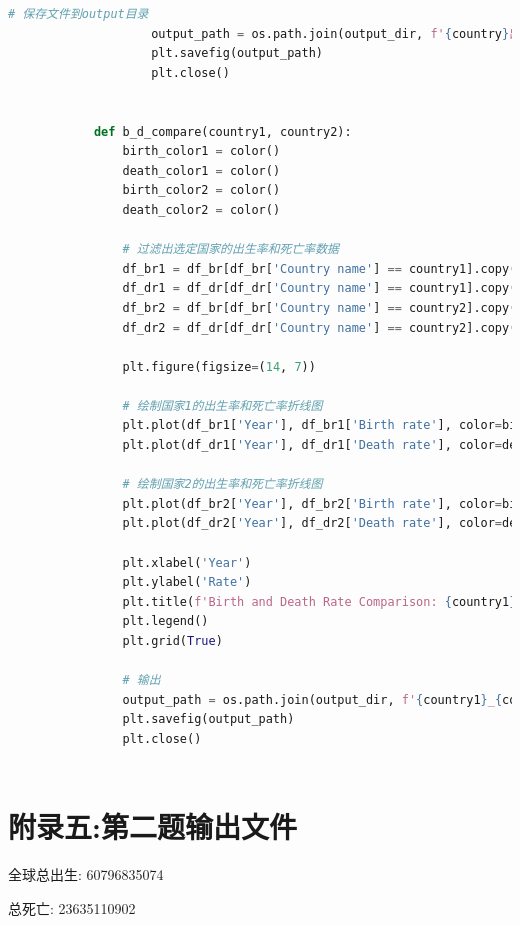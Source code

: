\documentclass{ctexart}
\begin{document}
\begin{lstlisting}[language=Python]
                    # 保存文件到output目录
                    output_path = os.path.join(output_dir, f'{country}出生死亡人数折线图.png')
                    plt.savefig(output_path)
                    plt.close()


            def b_d_compare(country1, country2):
                birth_color1 = color()
                death_color1 = color()
                birth_color2 = color()
                death_color2 = color()

                # 过滤出选定国家的出生率和死亡率数据
                df_br1 = df_br[df_br['Country name'] == country1].copy()
                df_dr1 = df_dr[df_dr['Country name'] == country1].copy()
                df_br2 = df_br[df_br['Country name'] == country2].copy()
                df_dr2 = df_dr[df_dr['Country name'] == country2].copy()

                plt.figure(figsize=(14, 7))

                # 绘制国家1的出生率和死亡率折线图
                plt.plot(df_br1['Year'], df_br1['Birth rate'], color=birth_color1, marker='o', linestyle='-', label=f'{country1} Birth Rate')
                plt.plot(df_dr1['Year'], df_dr1['Death rate'], color=death_color1, marker='x', linestyle='--', label=f'{country1} Death Rate')

                # 绘制国家2的出生率和死亡率折线图
                plt.plot(df_br2['Year'], df_br2['Birth rate'], color=birth_color2, marker='o', linestyle='-', label=f'{country2} Birth Rate')
                plt.plot(df_dr2['Year'], df_dr2['Death rate'], color=death_color2, marker='x', linestyle='--', label=f'{country2} Death Rate')

                plt.xlabel('Year')
                plt.ylabel('Rate')
                plt.title(f'Birth and Death Rate Comparison: {country1} vs {country2}')
                plt.legend()
                plt.grid(True)

                # 输出
                output_path = os.path.join(output_dir, f'{country1}_{country2}比较.png')
                plt.savefig(output_path)
                plt.close()
    
        \end{lstlisting}
    \newpage

    \section{附录五:第二题输出文件}

    \tiny
    全球总出生: 60796835074 \par
    总死亡: 23635110902 \par
    
\end{document}
